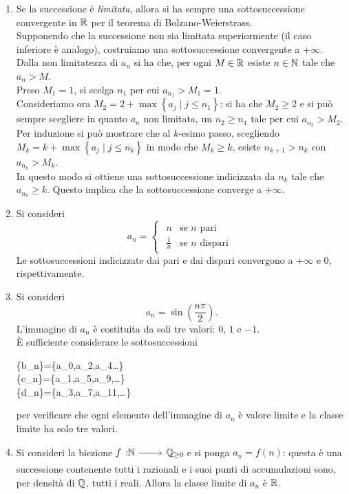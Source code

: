 \begin{solution}
\begin{enumerate}[label=\Roman*]
	\item Se la successione è \textit{limitata}, allora si ha sempre una sottosuccessione convergente in $\mathbb{R}$ per il teorema di Bolzano-Weierstrass.\\
	Supponendo che la successione non sia limitata superiormente (il caso inferiore è analogo), costruiamo una sottosuccessione convergente a $+\infty$. Dalla non limitatezza di $a_n$ si ha che, per ogni $M\in\mathbb{R}$ esiste $n\in\mathbb{N}$ tale che $a_n>M$.\\
	Preso $M_1=1$, si scelga $n_1$ per cui $a_{n_1}>M_1=1$.\\
	Consideriamo ora $M_2=2+\max\left\{a_j\mid j\leq n_1\right\}$: si ha che $M_2\geq 2$ e si può sempre scegliere in quanto $a_n$ non limitata, un $n_2\geq n_1$ tale per cui $a_{n_2}>M_2$.\\
	Per induzione si può mostrare che al $k$-esimo passo, scegliendo $M_k=k+\max\left\{a_j\mid j\leq n_k\right\}$ in modo che $M_k\geq k$, esiste $n_{k+1}>n_k$ con $a_{n_k}>M_k$.\\
	In questo modo si ottiene una sottosuccessione indicizzata da $n_k$ tale che $a_{n_k}\geq k$. Questo implica che la sottosuccessione converge a $+\infty$.
	\item Si consideri 
	\begin{equation*}
		a_n=\begin{cases}
			\begin{array}{ll}
				n&\text{se }n \text{ pari}\\
				\frac{1}{n}&\text{se }n \text{ dispari}
			\end{array}
		\end{cases}
	\end{equation*}
	Le sottosuccessioni indicizzate dai pari e dai dispari convergono a $+\infty$ e $0$, rispettivamente.
	\item Si consideri 
	\begin{equation*}
		a_n=\sin\left(\frac{n\pi}{2}\right).
	\end{equation*}
	L'immagine di $a_n$ è costituita da soli tre valori: $0$, $1$ e $-1$.\\
	È sufficiente considerare le sottosuccessioni
	\begin{flalign*}
		\left\{b_n\right\}=\left\{a_0,a_2,a_4\ldots\right\}\\
		\left\{c_n\right\}=\left\{a_1,a_5,a_9,\ldots\right\}\\
		\left\{d_n\right\}=\left\{a_3,a_7,a_11,\ldots\right\}
	\end{flalign*}
	per verificare che ogni elemento dell'immagine di $a_n$ è valore limite e la classe limite ha solo tre valori.
	\item Si consideri la biezione $\funz{f}{\naturalset}{\rationalset_{\geq 0}}$ e si ponga $a_n=f\left(n\right)$: questa è una successione contenente tutti i razionali e i suoi punti di accumulazioni sono, per densità di $\mathbb{Q}$, tutti i reali. Allora la classe limite di $a_n$ è $\mathbb{R}$.
\end{enumerate}
\end{solution}
